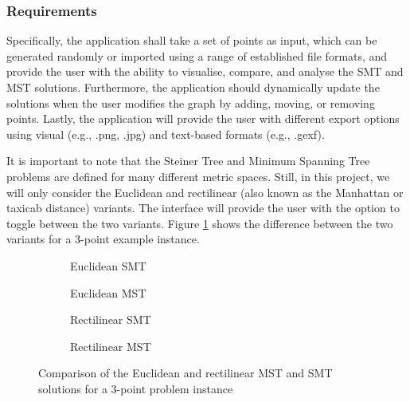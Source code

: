 \documentclass{l4proj}
\begin{document}
\subsubsection{Requirements}
Specifically, the application shall take a set of points as input, which can be generated randomly or imported using a range of established file formats, and provide the user with the ability to visualise, compare, and analyse the SMT and MST solutions.
Furthermore, the application should dynamically update the solutions when the user modifies the graph by adding, moving, or removing points.
Lastly, the application will provide the user with different export options using visual (e.g., .png, .jpg) and text-based formats (e.g., .gexf).

It is important to note that the Steiner Tree and Minimum Spanning Tree problems are defined for many different metric spaces. Still, in this project, we will only consider the Euclidean and rectilinear (also known as the Manhattan or taxicab distance) variants. The interface will provide the user with the option to toggle between the two variants. Figure \ref{fig:mst_rmst_3point} shows the difference between the two variants for a 3-point example instance.

\begin{figure}[htb]
    \begin{subfigure}[b]{0.24\textwidth}
        \centering
        
        \caption{Euclidean SMT}
    \end{subfigure}
    \begin{subfigure}[b]{0.24\textwidth}
        \centering
        
        \caption{Euclidean MST}
    \end{subfigure}
    \begin{subfigure}[b]{0.24\textwidth}
        \centering
        
        \caption{Rectilinear SMT}
    \end{subfigure}
    \begin{subfigure}[b]{0.24\textwidth}
        \centering
        
        \caption{Rectilinear MST}
    \end{subfigure}

    \caption{Comparison of the Euclidean and rectilinear MST and SMT solutions for a 3-point problem instance}
    \label{fig:mst_rmst_3point}
\end{figure}
\end{document}
